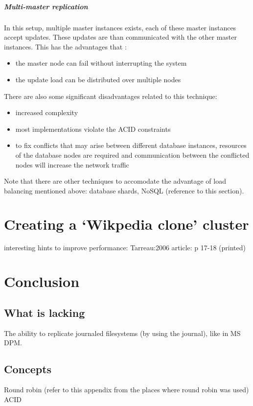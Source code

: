 \documentclass[12pt]{report}
\begin{document}
\paragraph*{Multi-master replication}
In this setup, multiple master instances exists, each of these master
instances accept updates. These updates are than communicated with the
other master instances. 
This has the advantages that :
\begin{itemize}
\item the master node can fail without interrupting the system
\item the update load can be distributed over multiple nodes
\end{itemize}
There are also some significant disadvantages related to this technique:
\begin{itemize} 
\item increased complexity
\item most implementations violate the ACID constraints
\item to fix conflicts that may arise between different database
  instances, resources of the database nodes are required and
  communication between the conflicted nodes will increase the network
  traffic
\end{itemize}
Note that there are other techniques to accomodate the advantage of
load balancing mentioned above: database shards, NoSQL (reference to
this section).

\chapter{Creating a `Wikpedia clone' cluster}
interesting hints to improve performance: Tarreau:2006 article: p
17-18 (printed)

\chapter{Conclusion} %
\section{What is lacking}
The ability to replicate journaled filesystems (by using the journal),
like in MS DPM.

\begin{appendices}
\chapter{Concepts}
Round robin (refer to this appendix from the places where round robin
was used)
ACID
\end{appendices}




{}


\end{document}

